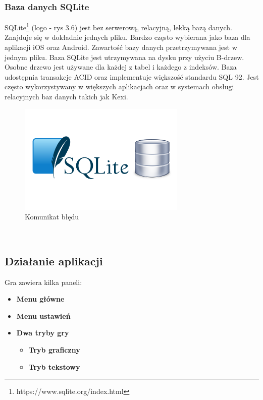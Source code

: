 \subsubsection{Baza danych SQLite}
\hspace*{0.60cm}SQLite\footnote{ https://www.sqlite.org/index.html} (logo - rys 3.6) jest bez serwerową, relacyjną, lekką bazą danych. Znajduje się w dokładnie jednych pliku. Bardzo często wybierana jako baza dla aplikacji iOS oraz Android. 
Zawartość bazy danych przetrzymywana jest w jednym pliku. Baza SQLite jest utrzymywana na dysku przy użyciu B-drzew. Osobne drzewo jest używane dla każdej z tabel i każdego z indeksów. Baza udostępnia transakcje ACID oraz implementuje większość standardu SQL 92. Jest często wykorzystywany w większych aplikacjach oraz w systemach obsługi relacyjnych baz danych takich jak Kexi.
\\
	\begin{figure}[!htb]
	\begin{center}
		\includegraphics[width=8cm]{rys/baza.png}
		\caption{Komunikat błędu}
		\label{rys:rysunek001}
	\end{center}
\end{figure}
\\
\subsection{Działanie aplikacji}
\hspace*{0.60cm}Gra zawiera kilka paneli:
\begin{itemize}
	\item \textbf{Menu główne}
	\item \textbf{Menu ustawień} 
	\item   \textbf{Dwa tryby gry}
	\begin{itemize}
		\item \textbf{Tryb graficzny}
		\item \textbf{Tryb tekstowy} 
	\end{itemize}
\end{itemize}


